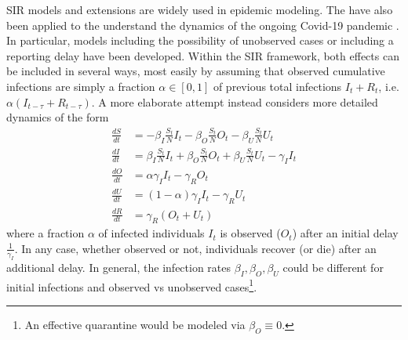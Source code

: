 \documentclass[a4paper]{tufte-handout}
\begin{document}
SIR models and extensions are widely used in epidemic modeling. The
have also been applied to the understand the dynamics of the ongoing
Covid-19 pandemic
\cite{arxiv:2002.07572,arxiv:2004.01105,10.1126/science.abb3221,https://www.medrxiv.org/content/10.1101/2020.02.27.20028639v2}.
In particular, models including the possibility of unobserved cases or
including a reporting delay have been developed. Within the SIR
framework, both effects can be included in several ways, most easily
by assuming that observed cumulative infections are simply a fraction
$\alpha \in [0, 1]$ of previous total infections $I_t + R_t$,
i.e. $\alpha (I_{t - \tau} + R_{t - \tau})$. A more elaborate attempt
instead considers more detailed dynamics of the form
\begin{align*}
  \frac{dS}{dt} &= - \beta_I \frac{S_t}{N} I_t - \beta_O \frac{S_t}{N} O_t - \beta_U \frac{S_t}{N} U_t \\
  \frac{dI}{dt} &= \beta_I \frac{S_t}{N} I_t + \beta_O \frac{S_t}{N} O_t + \beta_U \frac{S_t}{N} U_t - \gamma_I I_t \\
  \frac{dO}{dt} &= \alpha \gamma_I I_t - \gamma_R O_t \\
  \frac{dU}{dt} &= (1 - \alpha) \gamma_I I_t - \gamma_R U_t \\
  \frac{dR}{dt} &= \gamma_R (O_t + U_t)
\end{align*}
where a fraction $\alpha$ of infected individuals $I_t$ is observed
($O_t$) after an initial delay $\frac{1}{\gamma_I}$. In any case,
whether observed or not, individuals recover (or die) after an
additional delay. In general, the infection rates $\beta_I, \beta_O,
\beta_U$ could be different for initial infections and observed vs
unobserved cases\footnote{An effective quarantine would be modeled via
  $\beta_O \equiv 0$.}.
\end{document}
